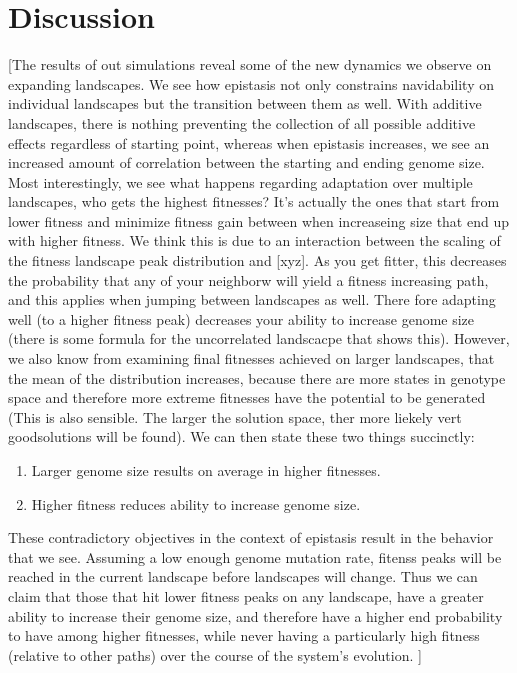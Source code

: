 \documentclass[paper=a4, fontsize=11pt,twoside]{scrartcl}       %
\begin{document}
\pagebreak

\section*{Discussion}

	[The results of out simulations reveal some of the new dynamics we observe on expanding landscapes. We see how epistasis not only constrains navidability on individual landscapes but the transition between them as well. With additive landscapes, there is nothing preventing the collection of all possible additive effects regardless of starting point, whereas when epistasis increases, we see an increased amount of correlation between the starting and ending genome size. Most interestingly, we see what happens regarding adaptation over multiple landscapes, who gets the highest fitnesses? It's actually the ones that start from lower fitness and minimize fitness gain between when increaseing size that end up with higher fitness. We think this is due to an interaction between the scaling of the fitness landscape peak distribution and [xyz]. As you get fitter, this decreases the probability that any of your neighborw will yield a fitness increasing path, and this applies when jumping between landscapes as well. There fore adapting well (to a higher fitness peak) decreases your ability to increase genome size (there is some formula for the uncorrelated landscacpe that shows this). However, we also know from examining final fitnesses achieved on larger landscapes, that the mean of the distribution increases, because there are more states in genotype space and therefore more extreme fitnesses have the potential to be generated (This is also sensible. The larger the solution space, ther more liekely vert goodsolutions will be found). We can then state these two things succinctly:
	\begin{enumerate}
		\item Larger genome size results on average in higher fitnesses. 
	
		\item Higher fitness reduces ability to increase genome size.
	\end{enumerate}
	These contradictory objectives in the context of epistasis result in the behavior that we see. Assuming a low enough genome mutation rate, fitenss peaks will be reached in the current landscape before landscapes will change. Thus we can claim that those that hit lower fitness peaks on any landscape, have a greater ability to increase their genome size, and therefore have a higher end probability to have among higher fitnesses, while never having a particularly high fitness (relative to other paths) over the course of the system's evolution. ]
\end{document}
